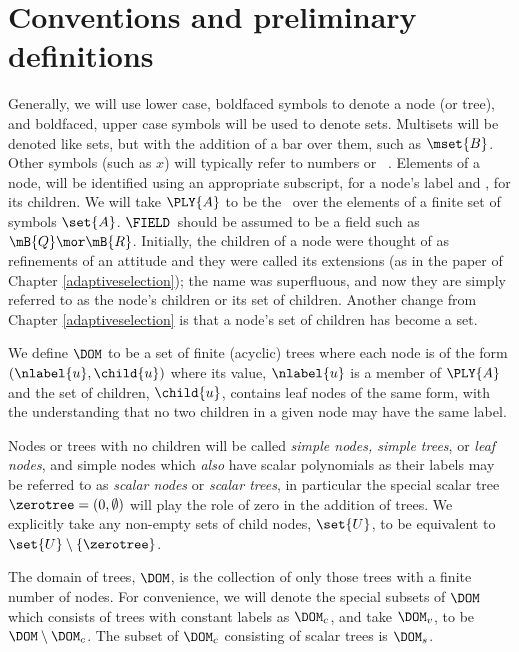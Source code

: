 \section{Conventions and preliminary definitions}

Generally, we will use lower case, boldfaced symbols to denote a node
(or tree), and boldfaced, upper case symbols will be used to denote
sets. Multisets will be denoted like sets, but with the addition of a
bar over them, such as $\mset{B}$. Other symbols (such as $x$) will
typically refer to numbers or \polyrat\ \polyforms. Elements of a
node,  will be identified using an appropriate
subscript,  for a node's label and
, for its children. We will take $\PLY{A}$ to be the
\polytypes\ over the elements of a finite set of symbols $\set{A}$.
$\FIELD$\ should be assumed to be a field such as $\mB{Q} \mor
\mB{R}$.  Initially, the children of a node were thought of as
refinements of an attitude and they were called its extensions (as in
the paper of Chapter \ref{adaptiveselection}); the name was
superfluous, and now they are simply referred to as the node's
children or its set of children.  Another change from Chapter
\ref{adaptiveselection} is that a node's set of children has become a
set.

\begin{definition}\label{def-of-dom}
We define $\DOM$ to be a set of finite (acyclic) trees where each node
is of the form $(\nlabel{u},\child{u})$ where its value,
\(\nlabel{u}\) is a member of $\PLY{A}$ and the set of children,
$\child{u}$, contains leaf nodes of the same form, with the
understanding that no two children in a given node may have the same
label.
\end{definition}

Nodes or trees with no children will be called \emph{simple nodes,
  simple trees}, or \emph{leaf nodes}, and simple nodes which
\emph{also\/} have scalar polynomials as their labels may be referred
to as \emph{scalar nodes} or \emph{scalar trees}, in particular the
special scalar tree $\zerotree = (0, \emptyset)$ will play the role of
zero in the addition of trees. We explicitly take any non-empty sets
of child nodes, $\set{U}$, to be equivalent to
$\set{U}\setminus\{\zerotree\}$. 

The domain of trees, $\DOM$, is the collection of only those trees
with a finite number of nodes. For convenience, we will denote the
special subsets of $\DOM$ which consists of trees with constant labels
as $\DOM_c$, and take $\DOM_v$, to be $\DOM \setminus \DOM_c$.  The
subset of $\DOM_c$ consisting of scalar trees is $\DOM_s$.

